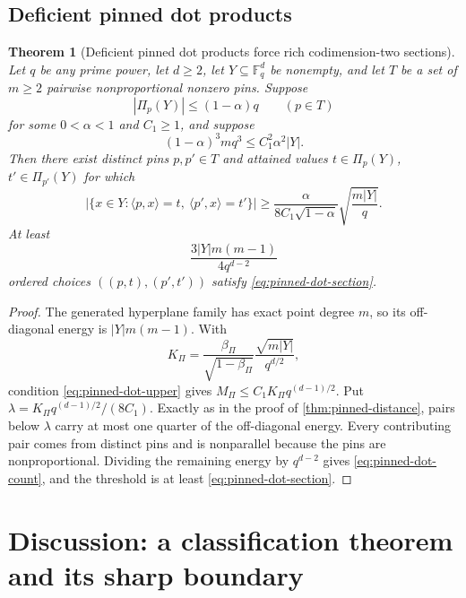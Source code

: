 \documentclass[11pt,letterpaper]{amsart}
\newtheorem{theorem}{Theorem}[section]
\theoremstyle{definition}
\theoremstyle{remark}
\newcommand{\1}{\mathbf 1}
\begin{document}
\subsection{Deficient pinned dot products}

\begin{theorem}[Deficient pinned dot products force rich codimension-two sections]\label{thm:pinned-dot}
Let $q$ be any prime power, let $d\ge2$, let $Y\subseteq\mathbb F_q^d$ be nonempty, and let $T$ be a set of $m\ge2$ pairwise nonproportional nonzero pins.  Suppose
\[
 |\Pi_p(Y)|\le(1-\alpha)q
 \qquad(p\in T)
\]
for some $0<\alpha<1$ and $C_1\ge1$, and suppose
\begin{equation}\label{eq:pinned-dot-upper}
 (1-\alpha)^3mq^3
 \le C_1^2\alpha^2|Y|.
\end{equation}
Then there exist distinct pins $p,p'\in T$ and attained values $t\in\Pi_p(Y)$, $t'\in\Pi_{p'}(Y)$ for which
\begin{equation}\label{eq:pinned-dot-section}
 |\{x\in Y:\langle p,x\rangle=t,\ \langle p',x\rangle=t'\}|
 \ge
 \frac{\alpha}{8C_1\sqrt{1-\alpha}}
 \sqrt{\frac{m|Y|}{q}}.
\end{equation}
At least
\begin{equation}\label{eq:pinned-dot-count}
 \frac{3|Y|m(m-1)}{4q^{d-2}}
\end{equation}
ordered choices $((p,t),(p',t'))$ satisfy \eqref{eq:pinned-dot-section}.
\end{theorem}

\begin{proof}
The generated hyperplane family has exact point degree $m$, so its off-diagonal energy is $|Y|m(m-1)$.  With
\[
 K_\Pi=\frac{\beta_\Pi}{\sqrt{1-\beta_\Pi}}
 \frac{\sqrt{m|Y|}}{q^{d/2}},
\]
condition \eqref{eq:pinned-dot-upper} gives $M_\Pi\le C_1K_\Pi q^{(d-1)/2}$.  Put $\lambda=K_\Pi q^{(d-1)/2}/(8C_1)$.  Exactly as in the proof of \cref{thm:pinned-distance}, pairs below $\lambda$ carry at most one quarter of the off-diagonal energy.  Every contributing pair comes from distinct pins and is nonparallel because the pins are nonproportional.  Dividing the remaining energy by $q^{d-2}$ gives \eqref{eq:pinned-dot-count}, and the threshold is at least \eqref{eq:pinned-dot-section}.
\end{proof}

\section{Discussion: a classification theorem and its sharp boundary}\label{sec:discussion}
\end{document}
